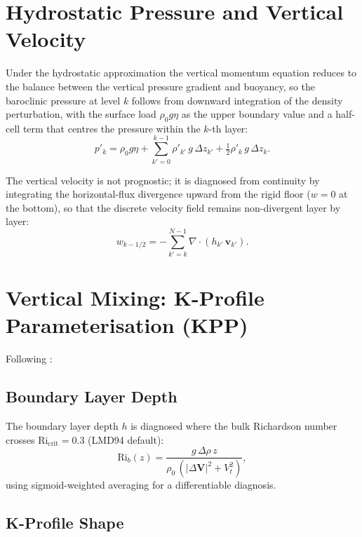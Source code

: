 \documentclass[11pt,twoside]{report}
\newcommand{\half}{\tfrac{1}{2}}
\newcommand{\vect}[1]{\bm{#1}}
\newcommand{\divg}{\nabla\!\cdot\!}
\begin{document}
\section{Hydrostatic Pressure and Vertical Velocity}

Under the hydrostatic approximation the vertical momentum equation reduces
to the balance between the vertical pressure gradient and buoyancy, so the
baroclinic pressure at level $k$ follows from downward integration of the
density perturbation, with the surface load $\rho_0 g\eta$ as the upper
boundary value and a half-cell term that centres the pressure within the
$k$-th layer:
\begin{equation}
  p'_k = \rho_0 g\eta + \sum_{k'=0}^{k-1}\rho'_{k'}\,g\,\Delta z_{k'}
  + \half\rho'_k\,g\,\Delta z_k.
\end{equation}

The vertical velocity is not prognostic; it is diagnosed from continuity
by integrating the horizontal-flux divergence upward from the rigid floor
($w=0$ at the bottom), so that the discrete velocity field remains
non-divergent layer by layer:
\begin{equation}
  w_{k-1/2} = -\sum_{k'=k}^{N-1}\divg(h_{k'}\,\vect{v}_{k'}).
\end{equation}


\section{Vertical Mixing: K-Profile Parameterisation (KPP)}
\label{sec:kpp}

Following \citet{LMD1994}:

\subsection{Boundary Layer Depth}

The boundary layer depth $h$ is diagnosed where the bulk Richardson number
crosses $\mathrm{Ri}_{\mathrm{crit}}=0.3$ (LMD94 default):
\begin{equation}
  \mathrm{Ri}_b(z) = \frac{g\,\Delta\rho\,z}
  {\rho_0\,(|\Delta\vect{V}|^2+V_t^2)},
\end{equation}
using sigmoid-weighted averaging for a differentiable diagnosis.

\subsection{K-Profile Shape}
\end{document}
